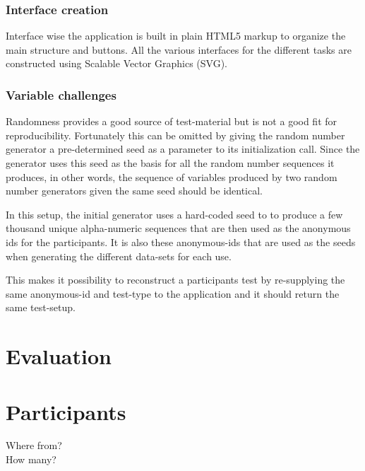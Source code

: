 \documentclass[nofilelist,dvipsnames]{cslthse-msc}
\begin{document}
			\subsection{Interface creation}

        Interface wise the application is built in plain HTML5 markup to
        organize the main structure and buttons. All the various interfaces for
        the different tasks are constructed using Scalable Vector Graphics
        (SVG).

			\subsection{Variable challenges}

        Randomness provides a good source of test-material but is not a good
        fit for reproducibility. Fortunately this can be omitted by giving the
        random number generator a pre-determined seed as a parameter to its
        initialization call. Since the generator uses this seed as the basis
        for all the random number sequences it produces, in other words, the
        sequence of variables produced by two random number generators given
        the same seed should be identical.

        In this setup, the initial generator uses a hard-coded seed to to
        produce a few thousand unique alpha-numeric sequences that are then
        used as the anonymous ids for the participants. It is also these
        anonymous-ids that are used as the seeds when generating the different
        data-sets for each use.

        This makes it possibility to reconstruct a participants test by
        re-supplying the same anonymous-id and test-type to the application and
        it should return the same test-setup.


	\chapter{Evaluation}

	  \chapter{Participants}

      Where from? \\

      How many? \\
\end{document}
